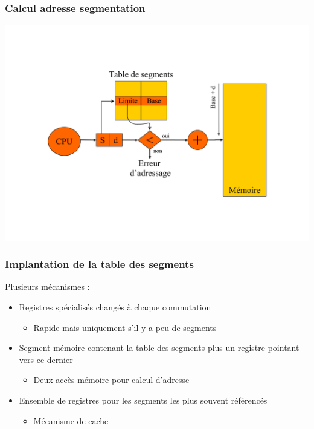 \begin{frame}
\frametitle{Calcul adresse segmentation}
\includegraphics[width=.9\textwidth]{../illustration/memoire_segment_acces.pdf}
\end{frame}


\begin{frame}
\frametitle{Implantation de la table des segments }
Plusieurs mécanismes :
\begin{itemize}
\item Registres spécialisés changés à chaque commutation
\begin{itemize}
\item Rapide mais uniquement s'il y a peu de segments
\end{itemize}
\item Segment mémoire contenant la table des segments plus un registre pointant vers ce dernier
\begin{itemize}
\item Deux accès mémoire pour calcul d'adresse
\end{itemize}
\item Ensemble de registres pour les segments les plus souvent référencés
\begin{itemize}
\item Mécanisme de cache
\end{itemize}
\end{itemize}
\end{frame}

